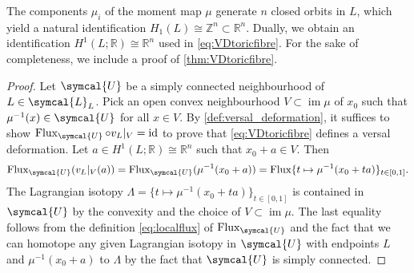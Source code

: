 \documentclass[12pt,a4paper,abstract=true,final]{scrartcl}
\DeclareMathOperator{\id}{id}
\begin{document}
The components $\mu_i$ of the moment map $\mu$ generate $n$ closed orbits in $L$, which yield a natural identification $H_1(L) \cong \mathbb{Z}^n \subset \mathbb{R}^n$.
Dually, we obtain an identification $H^1(L;\mathbb{R}) \cong \mathbb{R}^n$ used in \eqref{eq:VDtoricfibre}.
For the sake of completeness, we include a proof of \cref{thm:VDtoricfibre}.

\begin{proof}
    Let $\symcal{U}$ be a simply connected neighbourhood of $L \in \symcal{L}_{L}$.
    Pick an open convex neighbourhood $V \subset \operatorname{im} \mu$ of $x_0$ such that $\mu^{-1}(x) \in \symcal{U}$ for all $x \in V$.
    By \cref{def:versal_deformation}, it suffices to show $\operatorname{Flux}_{\symcal{U}} \circ v_L\vert_{V} = \id$ to prove that \eqref{eq:VDtoricfibre} defines a versal deformation.
    Let $a \in H^1(L;\mathbb{R}) \cong \mathbb{R}^n$ such that $x_0 + a \in V$.
Then 
    \begin{equation}
        \operatorname{Flux}_{\symcal{U}} ( v_L\vert_{V} (a))
        = \operatorname{Flux}_{\symcal{U}} (\mu^{-1}(x_0 + a))
        = \operatorname{Flux} \{t \mapsto \mu^{-1}(x_0 + ta) \}_{t \in [0,1]}.
    \end{equation}
    The Lagrangian isotopy $\Lambda = \{t \mapsto \mu^{-1}(x_0 + ta) \}_{t \in [0,1]}$ is contained in $\symcal{U}$ by the convexity and the choice of $V \subset \operatorname{im} \mu$.
    The last equality follows from the definition \eqref{eq:localflux} of $\operatorname{Flux}_{\symcal{U}}$ and the fact that we can homotope any given Lagrangian isotopy in $\symcal{U}$ with endpoints $L$ and $\mu^{-1}(x_0 + a)$ to $\Lambda$ by the fact that $\symcal{U}$ is simply connected. 


\end{proof}
\end{document}

